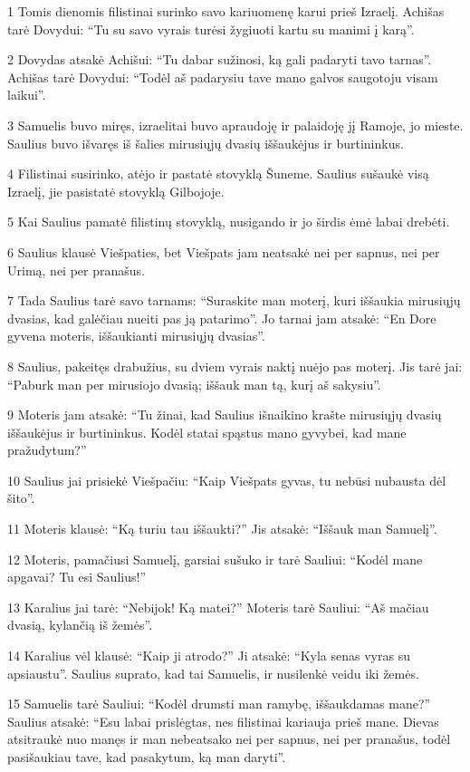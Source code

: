 \par 1 Tomis dienomis filistinai surinko savo kariuomenę karui prieš Izraelį. Achišas tarė Dovydui: “Tu su savo vyrais turėsi žygiuoti kartu su manimi į karą”. 
\par 2 Dovydas atsakė Achišui: “Tu dabar sužinosi, ką gali padaryti tavo tarnas”. Achišas tarė Dovydui: “Todėl aš padarysiu tave mano galvos saugotoju visam laikui”. 
\par 3 Samuelis buvo miręs, izraelitai buvo apraudoję ir palaidoję jį Ramoje, jo mieste. Saulius buvo išvaręs iš šalies mirusiųjų dvasių iššaukėjus ir burtininkus. 
\par 4 Filistinai susirinko, atėjo ir pastatė stovyklą Šuneme. Saulius sušaukė visą Izraelį, jie pasistatė stovyklą Gilbojoje. 
\par 5 Kai Saulius pamatė filistinų stovyklą, nusigando ir jo širdis ėmė labai drebėti. 
\par 6 Saulius klausė Viešpaties, bet Viešpats jam neatsakė nei per sapnus, nei per Urimą, nei per pranašus. 
\par 7 Tada Saulius tarė savo tarnams: “Suraskite man moterį, kuri iššaukia mirusiųjų dvasias, kad galėčiau nueiti pas ją patarimo”. Jo tarnai jam atsakė: “En Dore gyvena moteris, iššaukianti mirusiųjų dvasias”. 
\par 8 Saulius, pakeitęs drabužius, su dviem vyrais naktį nuėjo pas moterį. Jis tarė jai: “Paburk man per mirusiojo dvasią; iššauk man tą, kurį aš sakysiu”. 
\par 9 Moteris jam atsakė: “Tu žinai, kad Saulius išnaikino krašte mirusiųjų dvasių iššaukėjus ir burtininkus. Kodėl statai spąstus mano gyvybei, kad mane pražudytum?” 
\par 10 Saulius jai prisiekė Viešpačiu: “Kaip Viešpats gyvas, tu nebūsi nubausta dėl šito”. 
\par 11 Moteris klausė: “Ką turiu tau iššaukti?” Jis atsakė: “Iššauk man Samuelį”. 
\par 12 Moteris, pamačiusi Samuelį, garsiai sušuko ir tarė Sauliui: “Kodėl mane apgavai? Tu esi Saulius!” 
\par 13 Karalius jai tarė: “Nebijok! Ką matei?” Moteris tarė Sauliui: “Aš mačiau dvasią, kylančią iš žemės”. 
\par 14 Karalius vėl klausė: “Kaip ji atrodo?” Ji atsakė: “Kyla senas vyras su apsiaustu”. Saulius suprato, kad tai Samuelis, ir nusilenkė veidu iki žemės. 
\par 15 Samuelis tarė Sauliui: “Kodėl drumsti man ramybę, iššaukdamas mane?” Saulius atsakė: “Esu labai prislėgtas, nes filistinai kariauja prieš mane. Dievas atsitraukė nuo manęs ir man nebeatsako nei per sapnus, nei per pranašus, todėl pasišaukiau tave, kad pasakytum, ką man daryti”. 
